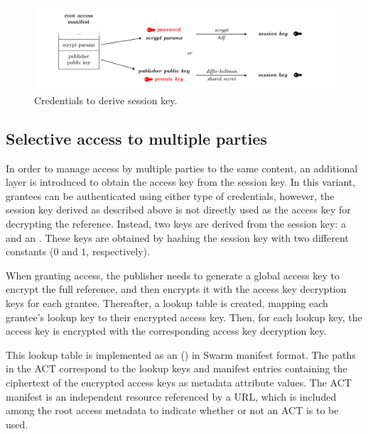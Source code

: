 \begin{figure}[htbp]
\centering
\includegraphics[width=\textwidth]{fig/credentials-to-derive-session-key.pdf}
\caption[Credentials to derive session key  \statusyellow]{Credentials to derive session key.}
\label{fig:credentials-to-derive-session-key}
\end{figure}


\subsection{Selective access to multiple parties\statusgreen}

In order to manage access by multiple parties to the same content, an additional layer is introduced to obtain the access key from the session key. In this variant, grantees can be authenticated using either type of credentials, however, the session key derived as
described above is not directly used as the access key for decrypting the reference. Instead, two keys are derived from the session key: a  and an . These keys are obtained by hashing the session key with two different constants ($0$ and $1$, respectively).

When granting access, the publisher needs to generate a global access key to encrypt the full reference, and then encrypts it with the
access key decryption keys for each grantee. Thereafter, a lookup table is created, mapping each grantee's lookup key to their encrypted access key. Then, for each lookup key, the access key is encrypted with the corresponding access key decryption key.

This lookup table is implemented as an  () in Swarm manifest format. The paths in the ACT correspond to the lookup keys and manifest entries containing the ciphertext of the encrypted access keys as metadata attribute values. The ACT manifest is an independent resource referenced by a URL, which is included among the root access metadata to indicate whether or not an ACT is to be used.


